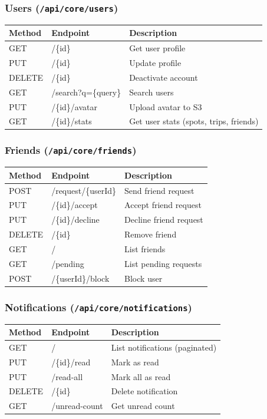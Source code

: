 \documentclass[12pt,letterpaper]{article}
\begin{document}
\subsubsection{Users (\texttt{/api/core/users})}
\begin{tabular}{|l|l|l|}
\hline
\textbf{Method} & \textbf{Endpoint} & \textbf{Description} \\
\hline
GET    & /\{id\} & Get user profile \\
PUT    & /\{id\} & Update profile \\
DELETE & /\{id\} & Deactivate account \\
GET    & /search?q=\{query\} & Search users \\
PUT    & /\{id\}/avatar & Upload avatar to S3 \\
GET    & /\{id\}/stats & Get user stats (spots, trips, friends) \\
\hline
\end{tabular}

\subsubsection{Friends (\texttt{/api/core/friends})}
\begin{tabular}{|l|l|l|}
\hline
\textbf{Method} & \textbf{Endpoint} & \textbf{Description} \\
\hline
POST   & /request/\{userId\} & Send friend request \\
PUT    & /\{id\}/accept & Accept friend request \\
PUT    & /\{id\}/decline & Decline friend request \\
DELETE & /\{id\} & Remove friend \\
GET    & / & List friends \\
GET    & /pending & List pending requests \\
POST   & /\{userId\}/block & Block user \\
\hline
\end{tabular}

\subsubsection{Notifications (\texttt{/api/core/notifications})}
\begin{tabular}{|l|l|l|}
\hline
\textbf{Method} & \textbf{Endpoint} & \textbf{Description} \\
\hline
GET    & / & List notifications (paginated) \\
PUT    & /\{id\}/read & Mark as read \\
PUT    & /read-all & Mark all as read \\
DELETE & /\{id\} & Delete notification \\
GET    & /unread-count & Get unread count \\
\hline
\end{tabular}
\end{document}
